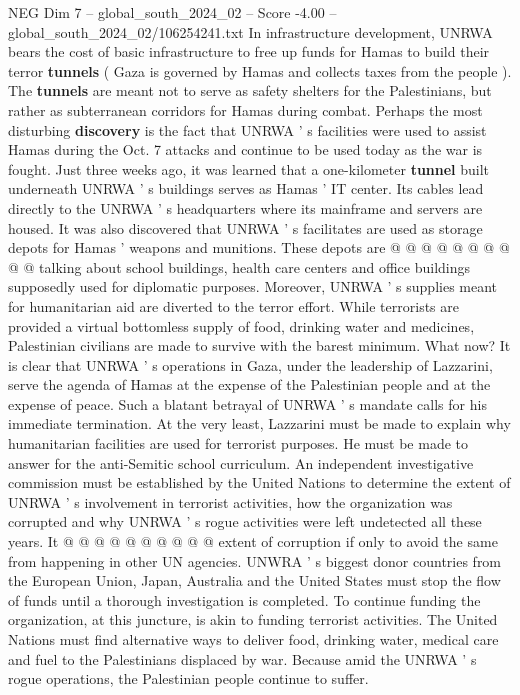 \begin{textsample}{NEG Dim 7 – global\_south\_2024\_02 – Score -4.00 – global\_south\_2024\_02/106254241.txt}
In infrastructure development, UNRWA bears the cost of basic infrastructure to free up funds for Hamas to build their terror \textbf{tunnels} ( Gaza is governed by Hamas and collects taxes from the people ).
The \textbf{tunnels} are meant not to serve as safety shelters for the Palestinians, but rather as subterranean corridors for Hamas during combat.
Perhaps the most disturbing \textbf{discovery} is the fact that UNRWA ' s facilities were used to assist Hamas during the Oct. 7 attacks and continue to be used today as the war is fought.
Just three weeks ago, it was learned that a one-kilometer \textbf{tunnel} built underneath UNRWA ' s buildings serves as Hamas ' IT center.
Its cables lead directly to the UNRWA ' s headquarters where its mainframe and servers are housed.
It was also discovered that UNRWA ' s facilitates are used as storage depots for Hamas ' weapons and munitions.
These depots are @ @ @ @ @ @ @ @ @ @ talking about school buildings, health care centers and office buildings supposedly used for diplomatic purposes.
Moreover, UNRWA ' s supplies meant for humanitarian aid are diverted to the terror effort.
While terrorists are provided a virtual bottomless supply of food, drinking water and medicines, Palestinian civilians are made to survive with the barest minimum.
What now?
It is clear that UNRWA ' s operations in Gaza, under the leadership of Lazzarini, serve the agenda of Hamas at the expense of the Palestinian people and at the expense of peace.
Such a blatant betrayal of UNRWA ' s mandate calls for his immediate termination.
At the very least, Lazzarini must be made to explain why humanitarian facilities are used for terrorist purposes.
He must be made to answer for the anti-Semitic school curriculum.
An independent investigative commission must be established by the United Nations to determine the extent of UNRWA ' s involvement in terrorist activities, how the organization was corrupted and why UNRWA ' s rogue activities were left undetected all these years.
It @ @ @ @ @ @ @ @ @ @ extent of corruption if only to avoid the same from happening in other UN agencies.
UNWRA ' s biggest donor countries from the European Union, Japan, Australia and the United States must stop the flow of funds until a thorough investigation is completed.
To continue funding the organization, at this juncture, is akin to funding terrorist activities.
The United Nations must find alternative ways to deliver food, drinking water, medical care and fuel to the Palestinians displaced by war.
Because amid the UNRWA ' s rogue operations, the Palestinian people continue to suffer.

\end{textsample}
